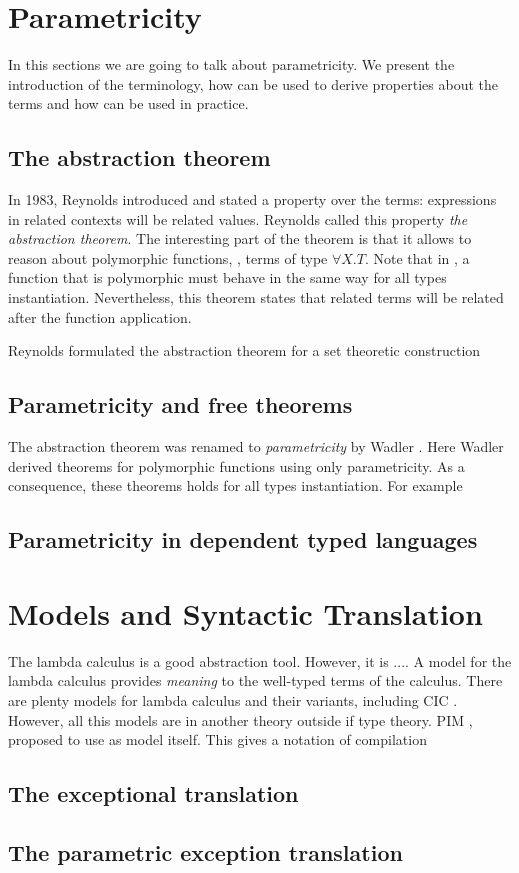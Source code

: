 
\section{Parametricity}
In this sections we are going to talk about parametricity. We present the introduction of the terminology,
how can be used to derive properties about the terms and how can be used in practice.

\subsection{The abstraction theorem}
\newcommand{\SetBool}{as}

In 1983, Reynolds \cite{Reynolds83:TypesAbstractionAndParametricPolymorphism} introduced \SystemF{} and
stated a property over the terms: expressions in related contexts will be related values. Reynolds called 
this property \emph{the abstraction theorem}. The interesting part of the theorem is that it allows 
to reason about polymorphic functions, \ie{}, terms of type $\forall X.T$. Note that in \SystemF{}, 
a function that is polymorphic must behave in the same way for all types instantiation. Nevertheless,
this theorem states that related terms will be related after the function application.

Reynolds formulated the abstraction theorem for a set theoretic construction

\subsection{Parametricity and free theorems}
The abstraction theorem was renamed to \emph{parametricity} by Wadler \cite{Wadler:1989:TheoremsForFree}.
Here Wadler derived theorems for polymorphic functions using only parametricity. As a consequence, 
these theorems holds for all types instantiation. For example

\subsection{Parametricity in dependent typed languages}

\section{Models and Syntactic Translation}
The lambda calculus is a good abstraction tool. However, it is .... A model for the lambda calculus 
provides \emph{meaning} to the well-typed terms of the calculus. There are plenty models for lambda 
calculus and their variants, including CIC \cite{timanySozeau:Consistency-pCuIC}. However, all this models
are in another theory outside if type theory. PIM  \cite{700syntactical}, proposed
to use as model \CIC{} itself. This gives a notation of compilation

\subsection{The exceptional translation}

\subsection{The parametric exception translation}

